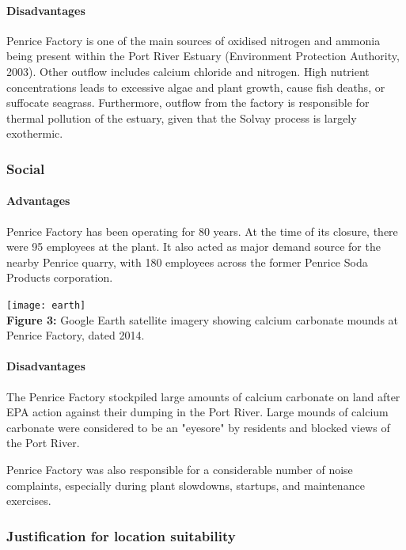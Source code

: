 \documentclass[12pt, a4paper]{article}
\begin{document}
\paragraph{Disadvantages}
Penrice Factory is one of the main sources of oxidised nitrogen and ammonia being present within the Port River Estuary (Environment Protection Authority, 2003). Other outflow includes calcium chloride and nitrogen. High nutrient concentrations leads to excessive algae and plant growth, cause fish deaths, or suffocate seagrass. Furthermore, outflow from the factory is responsible for thermal pollution of the estuary, given that the Solvay process is largely exothermic. 

\subsubsection{Social}

\paragraph{Advantages}
Penrice Factory has been operating for 80 years. At the time of its closure, there were 95 employees at the plant. It also acted as major demand source for the nearby Penrice quarry, with 180 employees across the former Penrice Soda Products corporation.

\begin{center}
\texttt{[image: earth]}
\\
\textbf{Figure 3:} Google Earth satellite imagery showing calcium carbonate mounds at Penrice Factory, dated 2014. 
\end{center}

\paragraph{Disadvantages}

The Penrice Factory stockpiled large amounts of calcium carbonate on land after EPA action against their dumping in the Port River. Large mounds of calcium carbonate were considered to be an "eyesore" by residents and blocked views of the Port River. 

Penrice Factory was also responsible for a considerable number of noise complaints, especially during plant slowdowns, startups, and maintenance exercises.

\subsubsection{Justification for location suitability}
\end{document}
